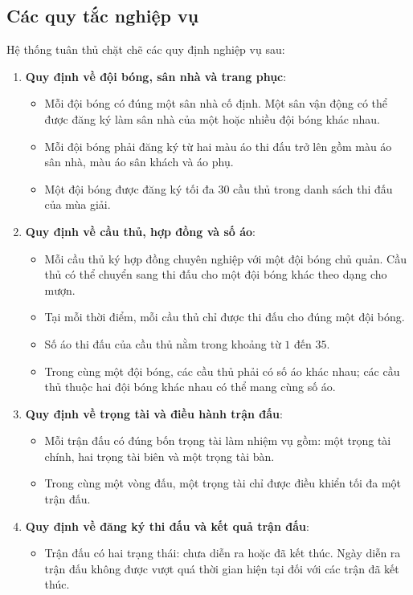 \subsection{Các quy tắc nghiệp vụ}
Hệ thống tuân thủ chặt chẽ các quy định nghiệp vụ sau:
\begin{enumerate}
    \item \textbf{Quy định về đội bóng, sân nhà và trang phục}:
    \begin{itemize}
        \item Mỗi đội bóng có đúng một sân nhà cố định. Một sân vận động có thể được đăng ký làm sân nhà của một hoặc nhiều đội bóng khác nhau.
        \item Mỗi đội bóng phải đăng ký từ hai màu áo thi đấu trở lên gồm màu áo sân nhà, màu áo sân khách và áo phụ.
        \item Một đội bóng được đăng ký tối đa 30 cầu thủ trong danh sách thi đấu của mùa giải.
    \end{itemize}
    \item \textbf{Quy định về cầu thủ, hợp đồng và số áo}:
    \begin{itemize}
        \item Mỗi cầu thủ ký hợp đồng chuyên nghiệp với một đội bóng chủ quản. Cầu thủ có thể chuyển sang thi đấu cho một đội bóng khác theo dạng cho mượn.
        \item Tại mỗi thời điểm, mỗi cầu thủ chỉ được thi đấu cho đúng một đội bóng.
        \item Số áo thi đấu của cầu thủ nằm trong khoảng từ $1$ đến $35$.
        \item Trong cùng một đội bóng, các cầu thủ phải có số áo khác nhau; các cầu thủ thuộc hai đội bóng khác nhau có thể mang cùng số áo.
    \end{itemize}
    \item \textbf{Quy định về trọng tài và điều hành trận đấu}:
    \begin{itemize}
        \item Mỗi trận đấu có đúng bốn trọng tài làm nhiệm vụ gồm: một trọng tài chính, hai trọng tài biên và một trọng tài bàn.
        \item Trong cùng một vòng đấu, một trọng tài chỉ được điều khiển tối đa một trận đấu.
    \end{itemize}
    \item \textbf{Quy định về đăng ký thi đấu và kết quả trận đấu}:
    \begin{itemize}
        \item Trận đấu có hai trạng thái: chưa diễn ra hoặc đã kết thúc. Ngày diễn ra trận đấu không được vượt quá thời gian hiện tại đối với các trận đã kết thúc.

\end{itemize}
\end{enumerate}
